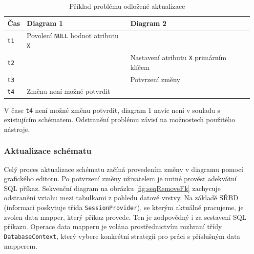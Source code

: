 \documentclass[czech,bachelor,public,dept460,male,oneside]{diploma}
\begin{document}
		\begin{table}[!h]
			\centering
			\caption{Příklad problému odložené aktualizace}
			\label{tab:lateUpdateIssue}
			\begin{tabular}{l l l}
				\toprule
				Čas & Diagram 1 & Diagram 2 \\
				\midrule
				\texttt{t1} & Povolení \texttt{NULL} hodnot atributu \texttt{X} & \\
				\texttt{t2} & & Nastavení atributu \texttt{X} primárním klíčem \\
				\texttt{t3} & & Potvrzení změny \\
				\texttt{t4} & Změnu není možné potvrdit & \\
				\midrule
			\end{tabular}
		\end{table}
		
		V čase \texttt{t4} není možné změnu potvrdit, diagram 1 navíc není v souladu s existujícím schématem. Odstranění problému závisí na možnostech použitého nástroje.
		
		\subsubsection{Aktualizace schématu} \label{secDbUpdate}
		Celý proces aktualizace schématu začíná provedením změny v diagramu pomocí grafického editoru. Po potvrzení změny uživatelem je nutné provést adekvátní SQL příkaz. Sekvenční diagram na obrázku \ref{fig:seqRemoveFk} zachycuje odstranění vztahu mezi tabulkami z pohledu datové vrstvy. Na základě SŘBD (informaci poskytuje třída \texttt{SessionProvider}), se kterým aktuálně pracujeme, je zvolen data mapper, který příkaz provede. Ten je zodpovědný i za sestavení SQL příkazu. Operace data mapperu je volána prostřednictvím rozhraní třídy \texttt{DatabaseContext}, který vybere konkrétní strategii pro práci s příslušným data mapperem. 
		
\end{document}

